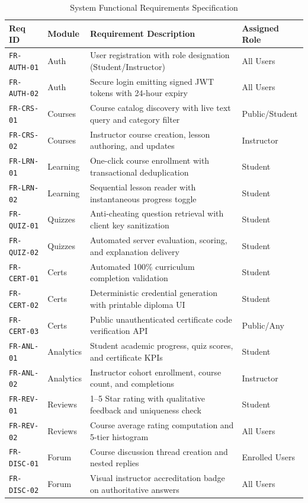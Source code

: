 \documentclass[12pt,a4paper]{report}
\begin{document}
\begin{table}[H]
\centering
\caption{System Functional Requirements Specification}
\label{tab:fr}
\begin{tabularx}{\textwidth}{@{}llXl@{}}
\toprule
\textbf{Req ID} & \textbf{Module} & \textbf{Requirement Description} & \textbf{Assigned Role} \\ \midrule
\texttt{FR-AUTH-01} & Auth & User registration with role designation (Student/Instructor) & All Users \\
\texttt{FR-AUTH-02} & Auth & Secure login emitting signed JWT tokens with 24-hour expiry & All Users \\
\texttt{FR-CRS-01} & Courses & Course catalog discovery with live text query and category filter & Public/Student \\
\texttt{FR-CRS-02} & Courses & Instructor course creation, lesson authoring, and updates & Instructor \\
\texttt{FR-LRN-01} & Learning & One-click course enrollment with transactional deduplication & Student \\
\texttt{FR-LRN-02} & Learning & Sequential lesson reader with instantaneous progress toggle & Student \\
\texttt{FR-QUIZ-01} & Quizzes & Anti-cheating question retrieval with client key sanitization & Student \\
\texttt{FR-QUIZ-02} & Quizzes & Automated server evaluation, scoring, and explanation delivery & Student \\
\texttt{FR-CERT-01} & Certs & Automated 100\% curriculum completion validation & Student \\
\texttt{FR-CERT-02} & Certs & Deterministic credential generation with printable diploma UI & Student \\
\texttt{FR-CERT-03} & Certs & Public unauthenticated certificate code verification API & Public/Any \\
\texttt{FR-ANL-01} & Analytics & Student academic progress, quiz scores, and certificate KPIs & Student \\
\texttt{FR-ANL-02} & Analytics & Instructor cohort enrollment, course count, and completions & Instructor \\
\texttt{FR-REV-01} & Reviews & 1--5 Star rating with qualitative feedback and uniqueness check & Student \\
\texttt{FR-REV-02} & Reviews & Course average rating computation and 5-tier histogram & All Users \\
\texttt{FR-DISC-01} & Forum & Course discussion thread creation and nested replies & Enrolled Users \\
\texttt{FR-DISC-02} & Forum & Visual instructor accreditation badge on authoritative answers & All Users \\ \bottomrule
\end{tabularx}
\end{table}
\end{document}
